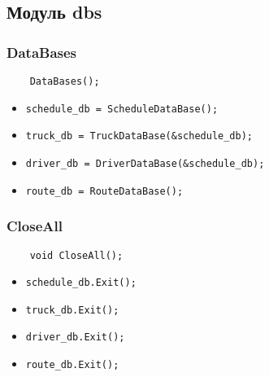\subsection{Модуль dbs}

\subsubsection{DataBases}

\begin{lstlisting}
    DataBases();
\end{lstlisting}

\begin{itemize}
    \item \verb|schedule_db = ScheduleDataBase();|
    \item \verb|truck_db = TruckDataBase(&schedule_db);|
    \item \verb|driver_db = DriverDataBase(&schedule_db);|
    \item \verb|route_db = RouteDataBase();|
\end{itemize}

\subsubsection{CloseAll}

\begin{lstlisting}
    void CloseAll();
\end{lstlisting}

\begin{itemize}
    \item \verb|schedule_db.Exit();|
    \item \verb|truck_db.Exit();|
    \item \verb|driver_db.Exit();|
    \item \verb|route_db.Exit();|
\end{itemize}

